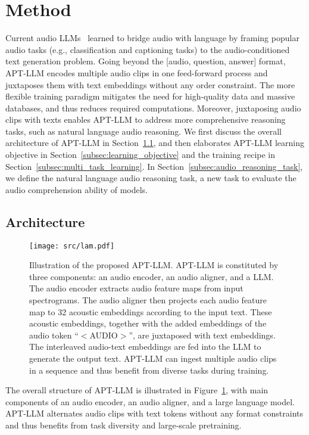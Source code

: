 \documentclass{article} %
\begin{document}
\section{Method} \label{sec:APT LLMs}
Current audio LLMs~\citep{gong_listen_2023,deshmukh_pengi_2023} learned to bridge audio with language by framing popular audio tasks (e.g., classification and captioning tasks) to the audio-conditioned text generation problem. Going beyond the [audio, question, answer] format, APT-LLM encodes multiple audio clips in one feed-forward process and juxtaposes them with text embeddings without any order constraint. The more flexible training paradigm mitigates the need for high-quality data and massive databases, and thus reduces required computations. Moreover, juxtaposing audio clips with texts enables APT-LLM to address more comprehensive reasoning tasks, such as natural language audio reasoning. We first discuss the overall architecture of APT-LLM in Section~\ref{subsec:architecture}, and then elaborates APT-LLM learning objective in Section~\ref{subsec:learning_objective} and the training recipe in Section~\ref{subsec:multi_task_learning}. In Section~\ref{subsec:audio_reasoning_task}, we define the natural language audio reasoning task, a new task to evaluate the audio comprehension ability of models.
 
\subsection{Architecture} \label{subsec:architecture}
\begin{figure}[t]
    \centering
    \texttt{[image: src/lam.pdf]}
    \caption{Illustration of the proposed APT-LLM. APT-LLM is constituted by three components: an audio encoder, an audio aligner, and a LLM. The audio encoder extracts audio feature maps from input spectrograms. The audio aligner then projects each audio feature map to 32 acoustic embeddings according to the input text. These acoustic embeddings, together with the added embeddings of the audio token ``$<$AUDIO$>$'', are juxtaposed with text embeddings. The interleaved audio-text embeddings are fed into the LLM to generate the output text. APT-LLM can ingest multiple audio clips in a sequence and thus benefit from diverse tasks during training.}
    \label{fig.:lam}
    \vspace{-0.3cm}
\end{figure}

The overall structure of APT-LLM is illustrated in Figure~\ref{fig.:lam}, with main components of an audio encoder, an audio aligner, and a large language model. APT-LLM alternates audio clips with text tokens without any format constraints and thus benefits from task diversity and large-scale pretraining.
\end{document}
